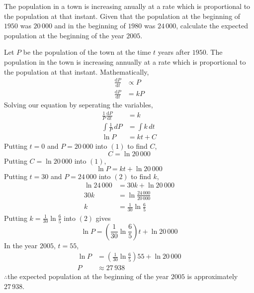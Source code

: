 \documentclass[11pt,a4paper]{book}
\begin{document}
\begin{example}

The population in a town is increasing anually at a rate which is
proportional to the population at that instant. Given that the population
at the beginning of $1950$ was $20\,000$ and in the beginning of
$1980$ was $24\,000$, calculate the expected population at the beginning
of the year $2005$.

\Solution

Let $P$ be the population of the town at the time $t$ years after
$1950$. The population in the town is increasing annually at a rate
which is proportional to the population at that instant. Mathematically,
\begin{align*}
\frac{\mathrm{d}P}{\mathrm{d}t} & \propto P\\
\frac{\mathrm{d}P}{\mathrm{d}t} & =kP
\end{align*}
Solving our equation by seperating the variables,
\begin{align*}
\frac{1}{P}\frac{\mathrm{d}P}{\mathrm{d}t} & =k\\
\int\frac{1}{P}\,dP & =\int k\,dt\\
\ln P & =kt+C\tag{1}
\end{align*}
Putting $t=0$ and $P=20\,000$ into $\left(1\right)$ to find $C$,
\[
C=\ln20\,000
\]
Putting $C=\ln20\,000$ into $\left(1\right)$,
\[
\ln P=kt+\ln20\,000\tag{2}
\]
Putting $t=30$ and $P=24\,000$ into $\left(2\right)$ to find $k$,
\begin{align*}
\ln24\,000 & =30k+\ln20\,000\\
30k & =\ln\frac{24\,000}{20\,000}\\
k & =\frac{1}{30}\ln\frac{6}{5}
\end{align*}
Putting ${\displaystyle k=\frac{1}{30}\ln\frac{6}{5}}$ into $\left(2\right)$
gives
\[
\ln P=\left(\frac{1}{30}\ln\frac{6}{5}\right)t+\ln20\,000
\]
In the year $2005$, $t=55$,
\begin{align*}
\ln P & =\left(\frac{1}{30}\ln\frac{6}{5}\right)55+\ln20\,000\\
P & \approx27\,938
\end{align*}
$\therefore$the expected population at the beginning of the year
$2005$ is approximately $27\,938$.

\end{example}

\newpage
\end{document}
